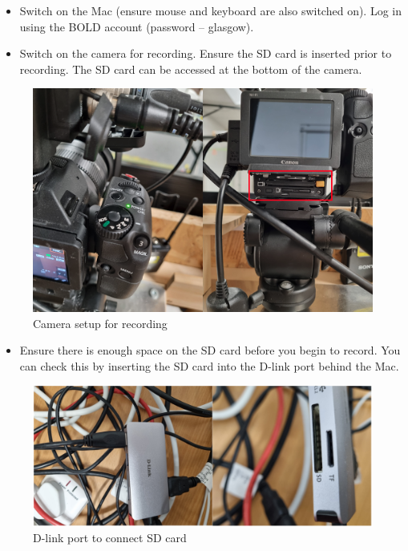 \documentclass[
]{book}
\providecommand{\tightlist}{%
  \setlength{\itemsep}{0pt}\setlength{\parskip}{0pt}}
\begin{document}
\begin{itemize}
\item
  Switch on the Mac (ensure mouse and keyboard are also switched on). Log in using the BOLD account (password -- glasgow).
\item
  Switch on the camera for recording. Ensure the SD card is inserted prior to recording. The SD card can be accessed at the bottom of the camera.
\end{itemize}

\begin{figure}

{\centering \includegraphics[width=1\linewidth]{Camera} 

}

\caption{Camera setup for recording}\label{fig:camera}
\end{figure}

\begin{itemize}
\tightlist
\item
  Ensure there is enough space on the SD card before you begin to record. You can check this by inserting the SD card into the D-link port behind the Mac.
\end{itemize}

\begin{figure}

{\centering \includegraphics[width=1\linewidth]{Port} 

}

\caption{D-link port to connect SD card}\label{fig:port}
\end{figure}
\end{document}

